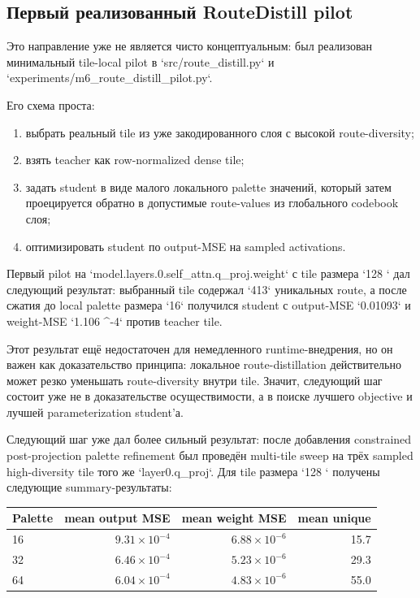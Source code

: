 \subsection{Первый реализованный RouteDistill pilot}

Это направление уже не является чисто концептуальным: был реализован минимальный
tile-local pilot в `src/route_distill.py` и `experiments/m6_route_distill_pilot.py`.

Его схема проста:

\begin{enumerate}[leftmargin=1.7em]
\item выбрать реальный tile из уже закодированного слоя с высокой route-diversity;
\item взять teacher как row-normalized dense tile;
\item задать student в виде малого локального palette значений, который затем
проецируется обратно в допустимые route-values из глобального codebook слоя;
\item оптимизировать student по output-MSE на sampled activations.
\end{enumerate}

Первый pilot на `model.layers.0.self_attn.q_proj.weight` с tile размера
`128 ` дал следующий результат: выбранный tile содержал `413`
уникальных route, а после сжатия до local palette размера `16` получился
student с output-MSE `0.01093` и weight-MSE `1.106 ^{-4}` против
teacher tile.

Этот результат ещё недостаточен для немедленного runtime-внедрения, но он важен
как доказательство принципа: локальное route-distillation действительно может
резко уменьшать route-diversity внутри tile. Значит, следующий шаг состоит уже
не в доказательстве осуществимости, а в поиске лучшего objective и лучшей
parameterization student'а.

Следующий шаг уже дал более сильный результат: после добавления constrained
post-projection palette refinement был проведён multi-tile sweep на трёх sampled
high-diversity tile того же `layer0.q_proj`. Для tile размера `128 `
получены следующие summary-результаты:

\begin{center}
\begin{tabular}{lrrr}
\toprule
Palette & mean output MSE & mean weight MSE & mean unique \\
\midrule
16 & $9.31 \times 10^{-4}$ & $6.88 \times 10^{-6}$ & 15.7 \\
32 & $6.46 \times 10^{-4}$ & $5.23 \times 10^{-6}$ & 29.3 \\
64 & $6.04 \times 10^{-4}$ & $4.83 \times 10^{-6}$ & 55.0 \\
\bottomrule
\end{tabular}
\end{center}

